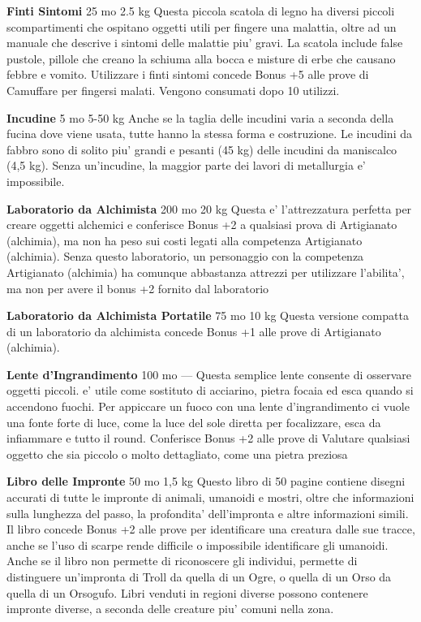 \documentclass[a4paper,11pt,twoside,openany]{dndbook}
\begin{document}
{\textbf{Finti Sintomi} 25 mo 2.5 kg Questa piccola scatola di legno ha diversi piccoli scompartimenti che ospitano oggetti utili per fingere una malattia, oltre ad un manuale che descrive i sintomi delle malattie piu' gravi. La scatola include false pustole, pillole che creano la schiuma alla bocca e misture di erbe che causano febbre e vomito. Utilizzare i finti sintomi concede Bonus +5 alle prove di Camuffare per fingersi malati. Vengono consumati dopo 10 utilizzi.

\textbf{Incudine} 5 mo 5-50 kg Anche se la taglia delle incudini varia a seconda della fucina dove viene usata, tutte hanno la stessa forma e costruzione. Le incudini da fabbro sono di solito piu' grandi e pesanti (45 kg) delle incudini da maniscalco (4,5 kg). Senza un'incudine, la maggior parte dei lavori di metallurgia e' impossibile.

\textbf{Laboratorio da Alchimista} 200 mo 20 kg Questa e' l'attrezzatura perfetta per creare oggetti alchemici e conferisce Bonus +2 a qualsiasi prova di Artigianato (alchimia), ma non ha peso sui costi legati alla competenza Artigianato (alchimia). Senza questo laboratorio, un personaggio con la competenza Artigianato (alchimia) ha comunque abbastanza attrezzi per utilizzare l'abilita', ma non per avere il bonus +2 fornito dal laboratorio

\textbf{Laboratorio da Alchimista Portatile} 75 mo 10 kg Questa versione compatta di un laboratorio da alchimista concede Bonus +1 alle prove di Artigianato (alchimia).

\textbf{Lente d'Ingrandimento} 100 mo --- Questa semplice lente consente di osservare oggetti piccoli. e' utile come sostituto di acciarino, pietra focaia ed esca quando si accendono fuochi. Per appiccare un fuoco con una lente d'ingrandimento ci vuole una fonte forte di luce, come la luce del sole diretta per focalizzare, esca da infiammare e tutto il round. Conferisce Bonus +2 alle prove di Valutare qualsiasi oggetto che sia piccolo o molto dettagliato, come una pietra preziosa 

\textbf{Libro delle Impronte} 50 mo 1,5 kg Questo libro di 50 pagine contiene disegni accurati di tutte le impronte di animali, umanoidi e mostri, oltre che informazioni sulla lunghezza del passo, la profondita' dell'impronta e altre informazioni simili. Il libro concede Bonus +2 alle prove per identificare una creatura dalle sue tracce, anche se l'uso di scarpe rende difficile o impossibile identificare gli umanoidi. Anche se il libro non permette di riconoscere gli individui, permette di distinguere un'impronta di Troll da quella di un Ogre, o quella di un Orso da quella di un Orsogufo. Libri venduti in regioni diverse possono contenere impronte diverse, a seconda delle creature piu' comuni nella zona.

}
\end{document}
